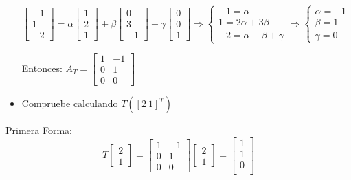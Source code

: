 \documentclass[12pt]{article}
\begin{document}
\begin{itemize}
    $\left[\begin{array}{c}
    -1\\
    1\\
    -2
    \end{array}\right]=\alpha\left[\begin{array}{c}
    1\\
    2\\
    1
    \end{array}\right]+\beta\left[\begin{array}{c}
    0\\
    3\\
    -1
    \end{array}\right]+\gamma\left[\begin{array}{c}
    0\\
    0\\
    1
    \end{array}\right]\Rightarrow\left\{ \begin{array}{c}
    -1=\alpha\\
    1=2\alpha+3\beta\\
    -2=\alpha-\beta+\gamma
    \end{array}\Rightarrow\left\{ \begin{array}{c}
        \alpha=-1\\
        \beta=1\\
        \gamma=0
    \end{array}\right.\right.$
    
    
     Entonces: $A_{T}=\left[\begin{array}{cc}
    1 & -1\\
    0 & 1\\
    0 & 0
\end{array}\right]$
    
    \item Compruebe calculando $T([2 \ 1]^T)$ \\
\end{itemize}

    Primera Forma:\\
   
    \[T\left[\begin{array}{c}
        2\\
        1
    \end{array}\right]=\left[\begin{array}{cc}
        1 & -1\\
        0 & 1\\
        0 & 0
    \end{array}\right]\left[\begin{array}{c}
        2\\
        1
    \end{array}\right]=\left[\begin{array}{c}
        1\\
        1\\
        0\\
\end{array}\right]\]
\end{document}
